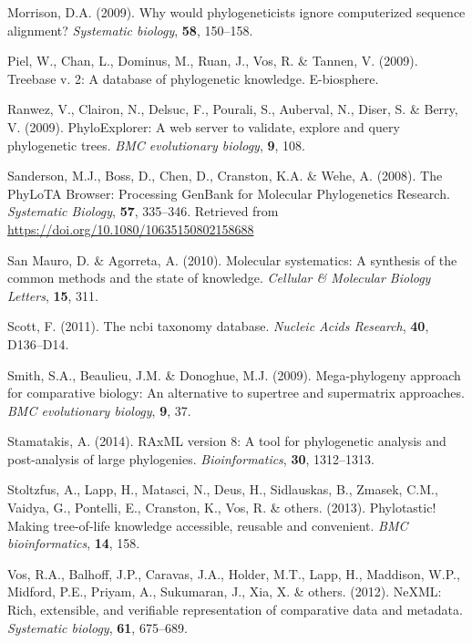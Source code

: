 \documentclass[]{article}
\begin{document}
\leavevmode\hypertarget{ref-morrison2009would}{}%
Morrison, D.A. (2009). Why would phylogeneticists ignore computerized sequence alignment? \emph{Systematic biology}, \textbf{58}, 150--158.

\leavevmode\hypertarget{ref-piel2009treebase}{}%
Piel, W., Chan, L., Dominus, M., Ruan, J., Vos, R. \& Tannen, V. (2009). Treebase v. 2: A database of phylogenetic knowledge. E-biosphere.

\leavevmode\hypertarget{ref-ranwez2009phyloexplorer}{}%
Ranwez, V., Clairon, N., Delsuc, F., Pourali, S., Auberval, N., Diser, S. \& Berry, V. (2009). PhyloExplorer: A web server to validate, explore and query phylogenetic trees. \emph{BMC evolutionary biology}, \textbf{9}, 108.

\leavevmode\hypertarget{ref-sanderson2008phylota}{}%
Sanderson, M.J., Boss, D., Chen, D., Cranston, K.A. \& Wehe, A. (2008). The PhyLoTA Browser: Processing GenBank for Molecular Phylogenetics Research. \emph{Systematic Biology}, \textbf{57}, 335--346. Retrieved from \url{https://doi.org/10.1080/10635150802158688}

\leavevmode\hypertarget{ref-san2010molecular}{}%
San Mauro, D. \& Agorreta, A. (2010). Molecular systematics: A synthesis of the common methods and the state of knowledge. \emph{Cellular \& Molecular Biology Letters}, \textbf{15}, 311.

\leavevmode\hypertarget{ref-scott2011ncbi}{}%
Scott, F. (2011). The ncbi taxonomy database. \emph{Nucleic Acids Research}, \textbf{40}, D136--D14.

\leavevmode\hypertarget{ref-smith2009mega}{}%
Smith, S.A., Beaulieu, J.M. \& Donoghue, M.J. (2009). Mega-phylogeny approach for comparative biology: An alternative to supertree and supermatrix approaches. \emph{BMC evolutionary biology}, \textbf{9}, 37.

\leavevmode\hypertarget{ref-stamatakis2014raxml}{}%
Stamatakis, A. (2014). RAxML version 8: A tool for phylogenetic analysis and post-analysis of large phylogenies. \emph{Bioinformatics}, \textbf{30}, 1312--1313.

\leavevmode\hypertarget{ref-stoltzfus2013phylotastic}{}%
Stoltzfus, A., Lapp, H., Matasci, N., Deus, H., Sidlauskas, B., Zmasek, C.M., Vaidya, G., Pontelli, E., Cranston, K., Vos, R. \& others. (2013). Phylotastic! Making tree-of-life knowledge accessible, reusable and convenient. \emph{BMC bioinformatics}, \textbf{14}, 158.

\leavevmode\hypertarget{ref-vos2012nexml}{}%
Vos, R.A., Balhoff, J.P., Caravas, J.A., Holder, M.T., Lapp, H., Maddison, W.P., Midford, P.E., Priyam, A., Sukumaran, J., Xia, X. \& others. (2012). NeXML: Rich, extensible, and verifiable representation of comparative data and metadata. \emph{Systematic biology}, \textbf{61}, 675--689.
\end{document}
